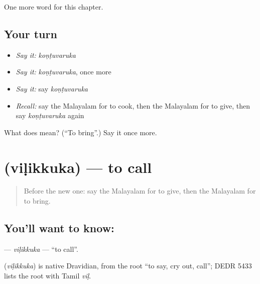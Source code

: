 \begin{grammarlens}[title={What you've built}]
One more word for this chapter.
\end{grammarlens}

\subsection*{Your turn}
\begin{itemize}
\raggedright
  \item \emph{Say it:} \emph{koṇṭuvaruka}
  \item \emph{Say it:} \emph{koṇṭuvaruka}, once more
  \item \emph{Say it:} say \emph{koṇṭuvaruka}
  \item \emph{Recall:} say the Malayalam for to cook, then the Malayalam for to give, then say \emph{koṇṭuvaruka} again
\end{itemize}

\begin{tcolorbox}[breakable,colback=teal!4,colframe=teal!35!black,title={Before you move on}]
What does  mean? (\textquotedblleft{}To bring\textquotedblright{}.) Say it once more.
\end{tcolorbox}
\section[\texorpdfstring{\ml{വിളിക്കുക} (viḷikkuka)}{വിളിക്കുക (viḷikkuka)}]{ (viḷikkuka) — to call}

\label{lesson:ML-C172-vilikkuka}



\begin{quote}
Before the new one: say the Malayalam for to give, then the Malayalam for to bring.
\end{quote}

\subsection*{You'll want to know: }
\textbf{} — \emph{viḷikkuka} — \textquotedblleft{}to call\textquotedblright{}.

\begin{cousinweb}
\textbf{} (\emph{viḷikkuka}) is native Dravidian, from the root \textquotedblleft{}to say, cry out, call\textquotedblright{}; DEDR 5433 lists the root with Tamil \emph{viḷ}.
\end{cousinweb}

